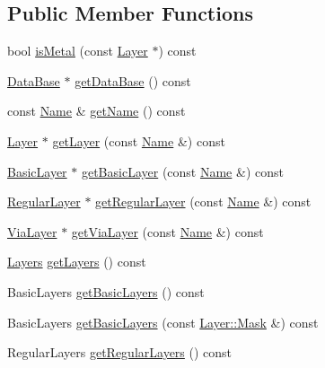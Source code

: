 \subsection*{Public Member Functions}
\begin{DoxyCompactItemize}
\item 
bool \hyperlink{classHurricane_1_1Technology_a4d47c9660b7240f0a0cf708464e257b9}{is\-Metal} (const \hyperlink{classHurricane_1_1Layer}{Layer} $\ast$) const 
\item 
\hyperlink{classHurricane_1_1DataBase}{Data\-Base} $\ast$ \hyperlink{classHurricane_1_1Technology_a9bb1db6c99a0b9acc780d4a699de525c}{get\-Data\-Base} () const 
\item 
const \hyperlink{classHurricane_1_1Name}{Name} \& \hyperlink{classHurricane_1_1Technology_ae7f587c80a8a60c4e9035d78ddb1996e}{get\-Name} () const 
\item 
\hyperlink{classHurricane_1_1Layer}{Layer} $\ast$ \hyperlink{classHurricane_1_1Technology_a4790fb7ff214db3617fa00dbda4109b1}{get\-Layer} (const \hyperlink{classHurricane_1_1Name}{Name} \&) const 
\item 
\hyperlink{classHurricane_1_1BasicLayer}{Basic\-Layer} $\ast$ \hyperlink{classHurricane_1_1Technology_a884a93c5bba0ee31b91b11a47350d1a5}{get\-Basic\-Layer} (const \hyperlink{classHurricane_1_1Name}{Name} \&) const 
\item 
\hyperlink{classHurricane_1_1RegularLayer}{Regular\-Layer} $\ast$ \hyperlink{classHurricane_1_1Technology_a08e0c52e4225623a264c4728ebb04478}{get\-Regular\-Layer} (const \hyperlink{classHurricane_1_1Name}{Name} \&) const 
\item 
\hyperlink{classHurricane_1_1ViaLayer}{Via\-Layer} $\ast$ \hyperlink{classHurricane_1_1Technology_afd851564b2d1a47face5c95f1b58e170}{get\-Via\-Layer} (const \hyperlink{classHurricane_1_1Name}{Name} \&) const 
\item 
\hyperlink{namespaceHurricane_a7b7200a36ab7ce8a157ddbe78b625f38}{Layers} \hyperlink{classHurricane_1_1Technology_a89bbd3b4b956f556bf3ea5191892159e}{get\-Layers} () const 
\item 
Basic\-Layers \hyperlink{classHurricane_1_1Technology_ad3b57b3941ce368764c633795430d7ba}{get\-Basic\-Layers} () const 
\item 
Basic\-Layers \hyperlink{classHurricane_1_1Technology_a83a5f5cc157c865ecafaf31be6efcfc4}{get\-Basic\-Layers} (const \hyperlink{classHurricane_1_1Layer_af5277c670637bd5d910237e7afe01a91}{Layer\-::\-Mask} \&) const 
\item 
Regular\-Layers \hyperlink{classHurricane_1_1Technology_a0e30d771769dac2f02672278fb1fa334}{get\-Regular\-Layers} () const 

\end{DoxyCompactItemize}
